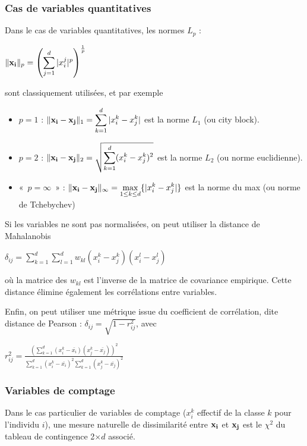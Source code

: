 \documentclass[letterpaper,10pt,french]{sphinxmanual}
\begin{document}
\subsubsection{Cas de variables quantitatives}
\label{\detokenize{clustering:cas-de-variables-quantitatives}}
\sphinxAtStartPar
Dans le cas de variables quantitatives, les normes  \(L_p\) :

\sphinxAtStartPar
\(\|{\bf x_i}\|_p=\left (\displaystyle\sum_{j=1}^d|x_i^j|^p\right ) ^\frac{1}{p}\)

\sphinxAtStartPar
sont classiquement utilisées, et par exemple
\begin{itemize}
\item {} 
\sphinxAtStartPar
\(p=1\) : \(\|{\bf x_i}-{\bf x_j}\|_1=\displaystyle\sum_{k=1}^d|x_i^k-x_j^k|\) est la norme \(L_1\) (ou city block).

\item {} 
\sphinxAtStartPar
\(p=2\) : \(\|{\bf x_i}-{\bf x_j}\|_2=\sqrt{\displaystyle\sum_{k=1}^d(x_i^k-x_j^k)^2}\) est la norme \(L_2\) (ou norme euclidienne).

\item {} 
\sphinxAtStartPar
« \(p=\infty\) » : \(\|{\bf x_i}-{\bf x_j}\|_\infty = \displaystyle\max_{1\leq k\leq d}\{|x_i^k-x_j^k|\}\) est la norme du max (ou norme de Tchebychev)

\end{itemize}

\sphinxAtStartPar
Si les variables ne sont pas normalisées, on peut utiliser la distance de Mahalanobis

\sphinxAtStartPar
\(\delta_{ij} = \displaystyle\sum_{k=1}^d\displaystyle\sum_{l=1}^dw_{kl}(x_i^k-x_j^k)(x_i^l-x_j^l)\)

\sphinxAtStartPar
où la matrice des \(w_{kl}\) est l’inverse de la matrice de covariance empirique. Cette distance élimine également les corrélations entre variables.

\sphinxAtStartPar
Enfin, on peut utiliser une métrique issue du coefficient de corrélation, dite distance de Pearson : \(\delta_{ij} =\sqrt{1-r^2_{ij}}\), avec

\sphinxAtStartPar
\(r^2_{ij} = \frac{\left (\displaystyle\sum_{k=1}^d (x_i^k-\bar{x_i})(x_j^k-\bar{x_j})\right )^2}{\displaystyle\sum_{k=1}^d(x_i^k-\bar{x_i})^2\displaystyle\sum_{k=1}^d(x_j^k-\bar{x_j})^2}\)


\subsubsection{Variables de comptage}
\label{\detokenize{clustering:variables-de-comptage}}
\sphinxAtStartPar
Dans le cas particulier de variables de comptage (\(x_i^k\) effectif de la classe \(k\) pour l’individu \(i\)), une mesure naturelle de dissimilarité entre \({\bf x_i}\) et \({\bf x_j}\) est le \(\chi^2\) du tableau de contingence 2\(\times d\) associé.
\end{document}
